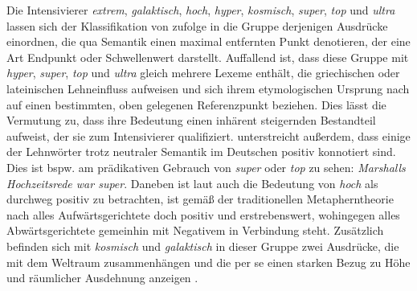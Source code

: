 Die Intensivierer \textit{extrem}, \textit{galaktisch}, \textit{hoch}, \textit{hyper}, \textit{kosmisch}, \textit{super}, \textit{top} und \textit{ultra} lassen sich der Klassifikation von \citet[359]{Claudi.2006} zufolge in die Gruppe derjenigen Ausdrücke einordnen, die qua Semantik einen maximal entfernten Punkt denotieren, der eine Art Endpunkt oder Schwellenwert darstellt. Auffallend ist, dass diese Gruppe mit \textit{hyper}, \textit{super}, \textit{top} und \textit{ultra} gleich mehrere Lexeme enthält, die griechischen oder lateinischen Lehneinfluss aufweisen und sich ihrem etymologischen Ursprung nach auf einen bestimmten, oben gelegenen Referenzpunkt beziehen. Dies lässt die Vermutung zu, dass ihre Bedeutung einen inhärent steigernden Bestandteil aufweist, der sie zum Intensivierer qualifiziert. {\citet[359]{Claudi.2006}} unterstreicht außerdem, dass einige der Lehnwörter trotz neutraler Semantik im Deutschen positiv konnotiert sind. Dies ist bspw. am prädikativen Gebrauch von \textit{super} oder \textit{top} zu sehen: \textit{Marshalls Hochzeitsrede war super}. Daneben ist laut \citet[359]{Claudi.2006} auch die Bedeutung von \textit{hoch} als durchweg positiv zu betrachten, ist gemäß der traditionellen Metapherntheorie nach {\citet[14ff.]{Lakoff.1980}} alles Aufwärtsgerichtete doch positiv und erstrebenswert, wohingegen alles Abwärtsgerichtete gemeinhin mit Negativem in Verbindung steht. Zusätzlich befinden sich mit \textit{kosmisch} und \textit{galaktisch} in dieser Gruppe zwei Ausdrücke, die mit dem Weltraum zusammenhängen und die per se einen starken Bezug zu Höhe und räumlicher Ausdehnung anzeigen {\citep[vgl.][359]{Claudi.2006}}.


